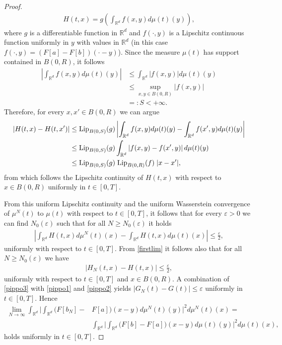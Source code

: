 \documentclass[A4paper,11pt]{article}
\theoremstyle{definition}
\newcommand{\Lip}{\textup{Lip}}
\newcommand{\R}{\mathbb{R}}
\begin{document}
\begin{proof}
\begin{align*}
	H(t,x) = g\left(\int_{\R^d} f(x,y) d\mu(t)(y)\right),
	\end{align*}
	where $g$ is a differentiable function in $\R^d$ and $f(\cdot,y)$ is a Lipschitz continuous function uniformly in $y$ with values in $\R^d$ (in this case $f(\cdot,y)=(F[a] -F[ b])(\cdot -y)$). Since the measure $\mu(t)$ has support contained in $B(0,R)$, it follows
	\begin{align*}
	\left|\int_{\R^d} f(x,y) d\mu(t)(y)\right| &\leq \int_{\R^d} |f(x,y)| d\mu(t)(y) \\
	& \leq \sup_{x,y \in B(0,R)} |f(x,y)|\\
	& =: S <+\infty.
	\end{align*}
	Therefore, for every $x, x' \in B(0,R)$ we can argue
	\begin{align*}
	\left|H(t,x)-H(t,x')\right| &\leq \Lip_{B(0,S)} (g) \left|\int_{\R^d} f(x,y) d\mu(t)(y) - \int_{\R^d} f(x',y) d\mu(t)(y)\right| \\
	&\leq \Lip_{B(0,S)} (g) \int_{\R^d} \left|f(x,y)  - f(x',y)\right|  d\mu(t)(y)\\
	&\leq \Lip_{B(0,S)} (g) \; \Lip_{B(0,R)} (f) \; |x-x'|,
	\end{align*}
	from which follows the Lipschitz continuity of $H(t,x)$ with respect to $x \in B(0,R)$ uniformly in $t \in [0,T]$.
	
	From this uniform Lipschitz continuity and the uniform Wasserstein convergence of $\mu^N(t)$ to $\mu(t)$ with respect to $t \in [0,T]$, it follows that for every $\varepsilon > 0$ we can find $N_0(\varepsilon)$ such that for all $N \geq N_0(\varepsilon)$ it holds
	\begin{align}\label{pippo1}
		\left|\int_{\R^d}H(t,x)d\mu^N(t)(x) - \int_{\R^d}H(t,x)d\mu(t)(x)\right|\leq \frac{\varepsilon}{2},
	\end{align}
	uniformly with respect to $t \in [0,T]$. From \eqref{firstlim} it follows also that for all $N \geq N_0(\varepsilon)$ we have
	\begin{align}\label{pippo2}
	\left|H_N(t,x) - H(t,x)\right| \leq \frac{\varepsilon}{2},
	\end{align}
	uniformly with respect to $t \in [0,T]$ and $x \in B(0,R)$. A combination of \eqref{pippo3} with \eqref{pippo1} and \eqref{pippo2}  yields $|G_N(t)-G(t)| \leq \varepsilon$ uniformly in $t \in [0,T]$. Hence
	\begin{align*}
		\lim_{N\rightarrow\infty}
			\int_{\R^d}\Biggl|\int_{\R^d}\bigl(F[ b_{N}]-&F[a]\bigr)(x-y)d\mu^{N}(t)(y)\Biggr|^2d\mu^N(t)(x) = \\
			&\int_{\R^d}\Biggl|\int_{\R^d}\bigl(F[ b]-F[a]\bigr)(x-y)d\mu(t)(y)\Biggr|^2d\mu(t)(x),
	\end{align*}
	 holds uniformly in $t \in [0,T]$.
	

\end{proof}
\end{document}
